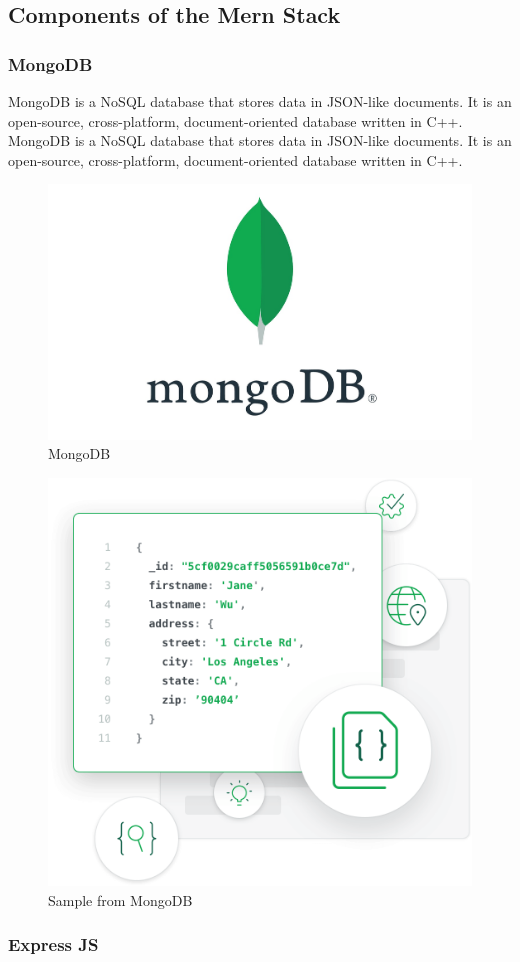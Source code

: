\documentclass[11pt]{article}
\begin{document}
\subsection{Components of the Mern Stack}

\subsubsection{MongoDB}

MongoDB is a NoSQL database that stores data in JSON-like documents. It is an open-source, cross-platform, document-oriented database written in C++. MongoDB is a NoSQL database that stores data in JSON-like documents. It is an open-source, cross-platform, document-oriented database written in C++.

\begin{figure}[H]
    \centering
    \includegraphics[width=.35\textwidth]{MongoDB/MongoDB_6.jpg}
    \caption{MongoDB}
\end{figure}

\begin{figure}[H]
    \centering
    \includegraphics[width=.72\textwidth]{MongoDB/MongoDB_7.jpg}
    \caption{Sample from MongoDB}
\end{figure}

\subsubsection{Express JS}
\end{document}
